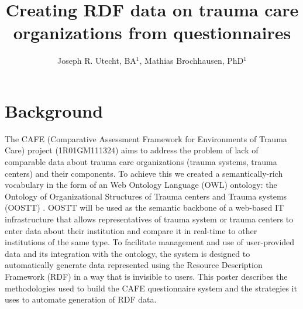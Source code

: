 \documentclass{amia}
\begin{document}
\title{Creating RDF data on trauma care organizations from questionnaires}

\author{Joseph R. Utecht, BA$^{1}$, Mathias Brochhausen, PhD$^{1}$}


\maketitle

\section*{Background}

The CAFE (Comparative Assessment Framework for Environments of Trauma Care) project (1R01GM111324) aims to address the problem of lack of comparable data about trauma care organizations (trauma systems, trauma centers) and their components.
To achieve this we created a semantically-rich vocabulary in the form of an Web Ontology Language (OWL)\cite{TODO} ontology: the Ontology of Organizational Structures of Trauma centers and Trauma systems (OOSTT) \cite{ref1}.
OOSTT will be used as the semantic backbone of a web-based IT infrastructure that allows representatives of trauma system or trauma centers to enter data about their institution and compare it in real-time to other institutions of the same type.
To facilitate management and use of user-provided data and its integration with the ontology, the system is designed to automatically generate data represented using the Resource Description Framework (RDF)\cite{TODO} in a way that is invisible to users.
This poster describes the methodologies used to build the CAFE questionnaire system and the strategies it uses to automate generation of RDF data.
\end{document}
